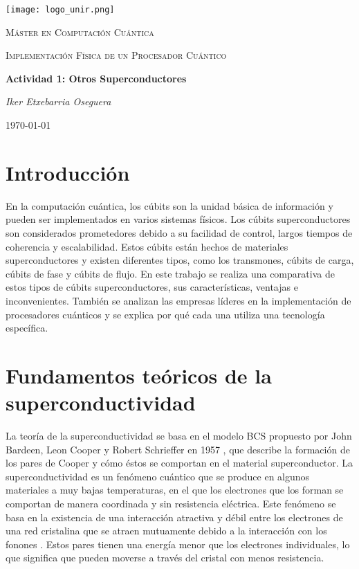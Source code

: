 \documentclass[12pt]{article}
\begin{document}
\begin{titlepage}
    \centering
    \texttt{[image: logo\_unir.png]}\par\vspace{1cm}
    \vspace{1cm}
    {\scshape\Large Máster en Computación Cuántica\par}    
    \vspace{1cm}
    {\scshape\Large Implementación Física de un Procesador Cuántico\par}
    \vspace{3cm}
    {\Huge\bfseries Actividad 1: Otros Superconductores\par}
    \vspace{1.5cm}
    {\Large\itshape Iker Etxebarria Oseguera\par}
    \vfill
    {\large \today\par}
\end{titlepage}

\newpage

\section{Introducción}

En la computación cuántica, los cúbits son la unidad básica de información y pueden ser implementados en varios sistemas físicos. Los cúbits superconductores son considerados prometedores debido a su facilidad de control, largos tiempos de coherencia y escalabilidad. Estos cúbits están hechos de materiales superconductores y existen diferentes tipos, como los transmones, cúbits de carga, cúbits de fase y cúbits de flujo. En este trabajo se realiza una comparativa de estos tipos de cúbits superconductores, sus características, ventajas e inconvenientes. También se analizan las empresas líderes en la implementación de procesadores cuánticos y se explica por qué cada una utiliza una tecnología específica.

\section{Fundamentos teóricos de la superconductividad}

La teoría de la superconductividad se basa en el modelo BCS propuesto por John Bardeen, Leon Cooper y Robert Schrieffer en 1957 \citep{bardeen_theory_1957}, que describe la formación de los pares de Cooper y cómo éstos se comportan en el material superconductor. La superconductividad es un fenómeno cuántico que se produce en algunos materiales a muy bajas temperaturas, en el que los electrones que los forman se comportan de manera coordinada y sin resistencia eléctrica. Este fenómeno se basa en la existencia de una interacción atractiva y débil \citep{bardeen_theory_1957} entre los electrones de una red cristalina que se atraen mutuamente debido a la interacción con los fonones \citep{ferrell_knight_1959}. Estos pares tienen una energía menor que los electrones individuales, lo que significa que pueden moverse a través del cristal con menos resistencia.
\end{document}
